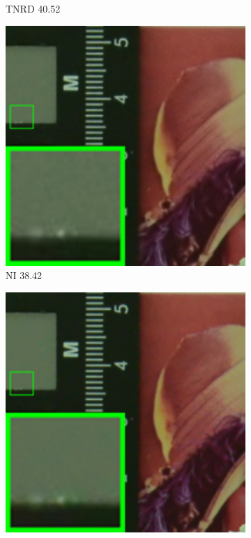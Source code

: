 \begin{figure}
\begin{subfigure}[t]{0.19\textwidth}
\caption{TNRD 40.52}
    \end{subfigure}
    \hfill
    \begin{subfigure}[t]{0.19\textwidth}
        \centering
        \includegraphics[width=1\textwidth]{images/mcwnnm/cc/resize_br_NI_CC15_d800_iso1600_2.png}
\caption{NI 38.42}
    \end{subfigure}
\hfill
    \begin{subfigure}[t]{0.19\textwidth}
        \centering
        \includegraphics[width=1\textwidth]{images/mcwnnm/cc/resize_br_NC_CC15_d800_iso1600_2.png}

\end{subfigure}
\end{figure}
